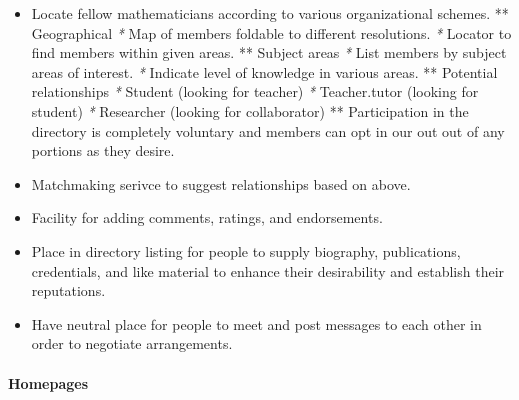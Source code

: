 \begin{itemize}
\begin{itemize}
\item
  Locate fellow mathematicians according to various organizational
  schemes. ** Geographical \emph{*} Map of members foldable to different
  resolutions. \emph{*} Locator to find members within given areas. **
  Subject areas \emph{*} List members by subject areas of interest.
  \emph{*} Indicate level of knowledge in various areas. ** Potential
  relationships \emph{*} Student (looking for teacher) \emph{*}
  Teacher.tutor (looking for student) \emph{*} Researcher (looking for
  collaborator) ** Participation in the directory is completely
  voluntary and members can opt in our out out of any portions as they
  desire.
\item
  Matchmaking serivce to suggest relationships based on above.
\item
  Facility for adding comments, ratings, and endorsements.
\item
  Place in directory listing for people to supply biography,
  publications, credentials, and like material to enhance their
  desirability and establish their reputations.
\item
  Have neutral place for people to meet and post messages to each other
  in order to negotiate arrangements.
\end{itemize}

\paragraph{Homepages}


\end{itemize}
